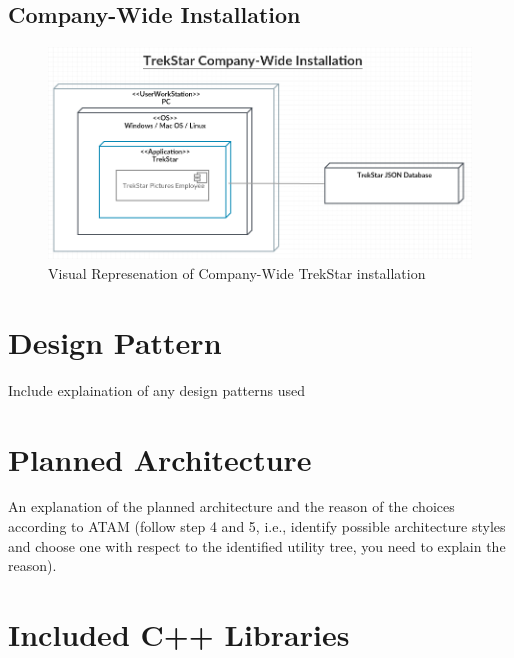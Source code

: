 \documentclass[
  english,
  a4paper,
,tablecaptionabove
]{scrartcl}
\begin{document}
\hypertarget{company-wide-installation}{%
\subsection{Company-Wide Installation}\label{company-wide-installation}}

\begin{figure}
\centering
\includegraphics{images/deployment-diagrams/trekstar-company-installation.png}
\caption{Visual Represenation of Company-Wide TrekStar installation}
\end{figure}

\newpage

\hypertarget{design-pattern}{%
\section{Design Pattern}\label{design-pattern}}

Include explaination of any design patterns used

\newpage

\hypertarget{planned-architecture}{%
\section{Planned Architecture}\label{planned-architecture}}

An explanation of the planned architecture and the reason of the choices
according to ATAM (follow step 4 and 5, i.e., identify possible
architecture styles and choose one with respect to the identified
utility tree, you need to explain the reason).

\newpage

\hypertarget{included-c-libraries}{%
\section{Included C++ Libraries}\label{included-c-libraries}}
\end{document}
